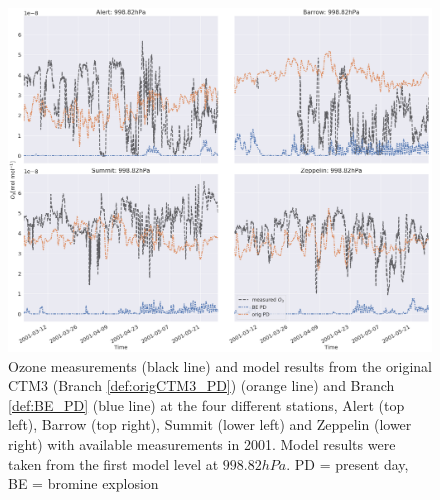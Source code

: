 \begin{figure}
    \centering
    \includegraphics[width = \linewidth]{Chapter6_Results/images/ozone_2001_compObsOrigBE.png}
    \caption{Ozone measurements (black line) and model results from the original CTM3 (Branch \ref{def:origCTM3_PD}) (orange line) and Branch \ref{def:BE_PD} (blue line) at the four different stations, Alert (top left), Barrow (top right), Summit (lower left) and Zeppelin (lower right) with available measurements in 2001. Model results were taken from the first model level at $998.82 hPa$. PD = present day, BE = bromine explosion}
    \label{fig:CompObsOrigBE}
\end{figure}